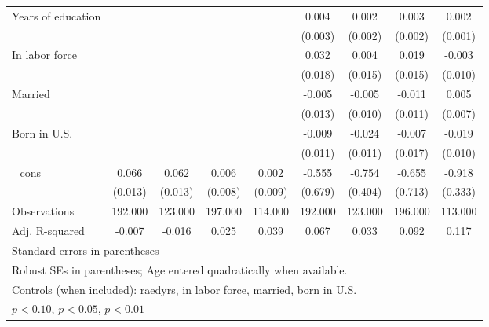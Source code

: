 \begin{table}[htbp]
\begin{tabular}{l*{8}{c}}
Years of education&                  &                  &                  &                  &    0.004         &    0.002         &    0.003         &    0.002         \\
          &                  &                  &                  &                  &  (0.003)         &  (0.002)         &  (0.002)         &  (0.001)         \\
In labor force&                  &                  &                  &                  &    0.032\sym{*}  &    0.004         &    0.019         &   -0.003         \\
          &                  &                  &                  &                  &  (0.018)         &  (0.015)         &  (0.015)         &  (0.010)         \\
Married   &                  &                  &                  &                  &   -0.005         &   -0.005         &   -0.011         &    0.005         \\
          &                  &                  &                  &                  &  (0.013)         &  (0.010)         &  (0.011)         &  (0.007)         \\
Born in U.S.&                  &                  &                  &                  &   -0.009         &   -0.024\sym{**} &   -0.007         &   -0.019\sym{*}  \\
          &                  &                  &                  &                  &  (0.011)         &  (0.011)         &  (0.017)         &  (0.010)         \\
\_cons    &    0.066\sym{***}&    0.062\sym{***}&    0.006         &    0.002         &   -0.555         &   -0.754\sym{*}  &   -0.655         &   -0.918\sym{***}\\
          &  (0.013)         &  (0.013)         &  (0.008)         &  (0.009)         &  (0.679)         &  (0.404)         &  (0.713)         &  (0.333)         \\
\midrule
Observations&  192.000         &  123.000         &  197.000         &  114.000         &  192.000         &  123.000         &  196.000         &  113.000         \\
Adj. R-squared&   -0.007         &   -0.016         &    0.025         &    0.039         &    0.067         &    0.033         &    0.092         &    0.117         \\
\bottomrule
\multicolumn{9}{l}{\footnotesize Standard errors in parentheses}\\
\multicolumn{9}{l}{\footnotesize Robust SEs in parentheses; Age entered quadratically when available.}\\
\multicolumn{9}{l}{\footnotesize Controls (when included): raedyrs, in labor force, married, born in U.S.}\\
\multicolumn{9}{l}{\footnotesize \sym{*} \(p<0.10\), \sym{**} \(p<0.05\), \sym{***} \(p<0.01\)}\\
\end{tabular}
\end{table}
